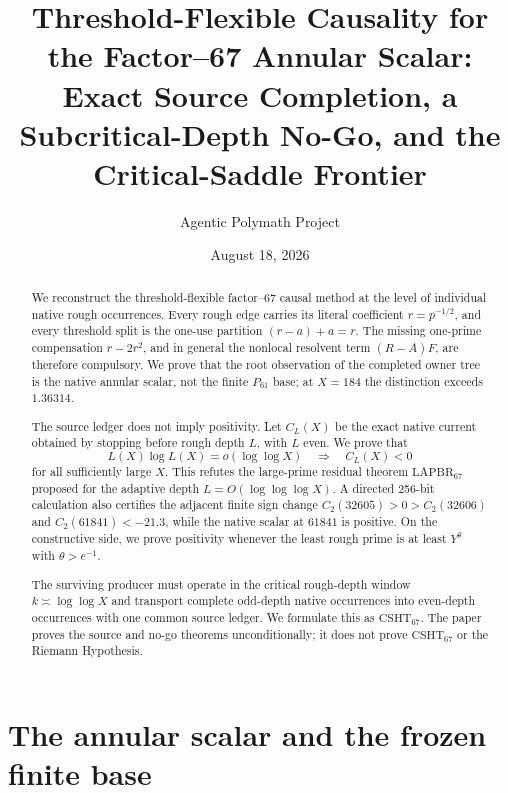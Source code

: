 \documentclass[11pt]{article}
\title{Threshold-Flexible Causality for the Factor--67 Annular Scalar:\\Exact Source Completion, a Subcritical-Depth No-Go, and the Critical-Saddle Frontier}
\author{Agentic Polymath Project}
\date{August 18, 2026}
\newcommand{\CSHT}{\mathrm{CSHT}_{67}}
\newcommand{\LAPBR}{\mathrm{LAPBR}_{67}}
\begin{document}
\maketitle

\begin{abstract}
We reconstruct the threshold-flexible factor--67 causal method at the level of
individual native rough occurrences.  Every rough edge carries its literal
coefficient $r=p^{-1/2}$, and every threshold split is the one-use partition
$(r-a)+a=r$.  The missing one-prime compensation $r-2r^2$, and in general the
nonlocal resolvent term $(R-A)F$, are therefore compulsory.  We prove that the
root observation of the completed owner tree is the native annular scalar, not
the finite $P_{61}$ base; at $X=184$ the distinction exceeds $1.36314$.

The source ledger does not imply positivity.  Let $C_L(X)$ be the exact native
current obtained by stopping before rough depth $L$, with $L$ even.  We prove
that
\[
 L(X)\log L(X)=o(\log\log X)
 \quad\Longrightarrow\quad C_L(X)<0
\]
for all sufficiently large $X$.  This refutes the large-prime residual theorem
$\LAPBR$ proposed for the adaptive depth $L=O(\log\log\log X)$.  A directed
256-bit calculation also certifies the adjacent finite sign change
$C_2(32605)>0>C_2(32606)$ and $C_2(61841)<-21.3$, while the native scalar at
$61841$ is positive.  On the constructive side, we prove positivity whenever
the least rough prime is at least $Y^\theta$ with $\theta>e^{-1}$.

The surviving producer must operate in the critical rough-depth window
$k\asymp\log\log X$ and transport complete odd-depth native occurrences into
even-depth occurrences with one common source ledger.  We formulate this as
$\CSHT$.  The paper proves the source and no-go theorems unconditionally; it
does not prove $\CSHT$ or the Riemann Hypothesis.
\end{abstract}

\begin{center}
\end{center}

\tableofcontents

\section{The annular scalar and the frozen finite base}
\end{document}
